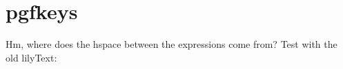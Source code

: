 

\usepackage{pgfkeys}


\newcommand\testpgf[2][]{%
	\pgfkeys{/lilyglpyh, #1}
	{{\fontspec[Scale=\lilyglyphScale]{Emmentaler-11} \XeTeXglyph\XeTeXglyphindex"#2" }}
}



\section*{pgfkeys}



Hm, where does the hspace between the expressions come from? Test with the old lilyText:


